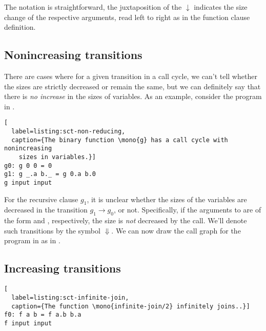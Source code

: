 

The notation is straightforward, the juxtaposition of the $\downarrow$
indicates the size change of the respective arguments, read left to right as in
the function clause definition.

\subsection{Nonincreasing transitions}

There are cases where for a given transition in a call cycle, we can't tell
whether the sizes are strictly decreased or remain the same, but we can
definitely say that there is \emph{no increase} in the sizes of variables. As
an example, consider the program in .

\begin{lstlisting}[
  label=listing:sct-non-reducing,
  caption={The binary function \mono{g} has a call cycle with nonincreasing
    sizes in variables.}]
g0: g 0 0 = 0
g1: g _.a b._ = g 0.a b.0
g input input
\end{lstlisting}


For the recursive clause $g_1$, it is unclear whether the sizes of the
variables are decreased in the transition $g_1\rightarrow g_0$, or not.
Specifically, if the arguments to  are of the form  and
, respectively, the size is \emph{not} decreased by the call. We'll
denote such transitions by the symbol $\Downarrow$. We can now draw the call
graph for the program in  as in
.



\subsection{Increasing transitions}




\begin{lstlisting}[
  label=listing:sct-infinite-join,
  caption={The function \mono{infinite-join/2} infinitely joins..}]
f0: f a b = f a.b b.a
f input input
\end{lstlisting}




